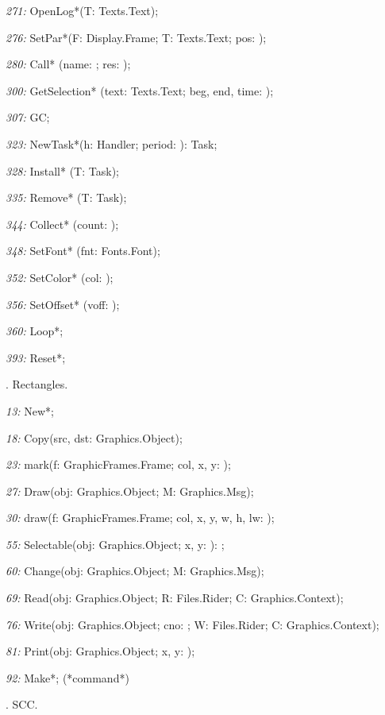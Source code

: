 \item{\it 271:} OpenLog*(T: Texts.Text);
\item{\it 276:} SetPar*(F: Display.Frame; T: Texts.Text; pos: \LONGINT);
\item{\it 280:} Call* (name: \ARRAYOF\CHAR; \VAR res: \INTEGER);
\item{\it 300:} GetSelection* (\VAR text: Texts.Text; \VAR beg, end, time: \LONGINT);
\item{\it 307:} GC;
\item{\it 323:} NewTask*(h: Handler; period: \INTEGER): Task;
\item{\it 328:} Install* (T: Task);
\item{\it 335:} Remove* (T: Task);
\item{\it 344:} Collect* (count: \INTEGER);
\item{\it 348:} SetFont* (fnt: Fonts.Font);
\item{\it 352:} SetColor* (col: \INTEGER);
\item{\it 356:} SetOffset* (voff: \INTEGER);
\item{\it 360:} Loop*;
\item{\it 393:} Reset*;

. Rectangles.

\item{\it 13:} New*;
\item{\it 18:} Copy(src, dst: Graphics.Object);
\item{\it 23:} mark(f: GraphicFrames.Frame; col, x, y: \INTEGER);
\item{\it 27:} Draw(obj: Graphics.Object; \VAR M: Graphics.Msg);
\item{\it 30:} draw(f: GraphicFrames.Frame; col, x, y, w, h, lw: \INTEGER);
\item{\it 55:} Selectable(obj: Graphics.Object; x, y: \INTEGER): \BOOLEAN;
\item{\it 60:} Change(obj: Graphics.Object; \VAR M: Graphics.Msg);
\item{\it 69:} Read(obj: Graphics.Object; \VAR R: Files.Rider; \VAR C: Graphics.Context);
\item{\it 76:} Write(obj: Graphics.Object; cno: \INTEGER; \VAR W: Files.Rider; \VAR C: Graphics.Context);
\item{\it 81:} Print(obj: Graphics.Object; x, y: \INTEGER);
\item{\it 92:} Make*;  (*command*)

. SCC.
  
